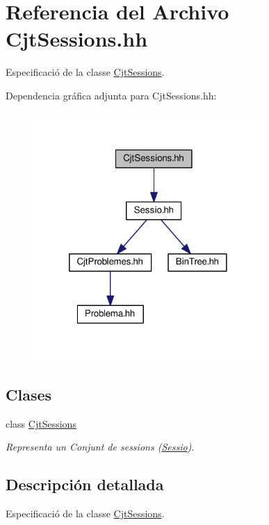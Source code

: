 \hypertarget{_cjt_sessions_8hh}{}\section{Referencia del Archivo Cjt\+Sessions.\+hh}
\label{_cjt_sessions_8hh}


Especificació de la classe \mbox{\hyperlink{class_cjt_sessions}{Cjt\+Sessions}}.  


Dependencia gráfica adjunta para Cjt\+Sessions.\+hh\+:\nopagebreak
\begin{figure}[H]
\begin{center}
\leavevmode
\includegraphics[width=248pt]{_cjt_sessions_8hh__incl}
\end{center}
\end{figure}
\subsection*{Clases}
\begin{DoxyCompactItemize}
\item 
class \mbox{\hyperlink{class_cjt_sessions}{Cjt\+Sessions}}
\begin{DoxyCompactList}\small\item\em Representa un Conjunt de sessions (\mbox{\hyperlink{class_sessio}{Sessio}}). \end{DoxyCompactList}\end{DoxyCompactItemize}


\subsection{Descripción detallada}
Especificació de la classe \mbox{\hyperlink{class_cjt_sessions}{Cjt\+Sessions}}. 

